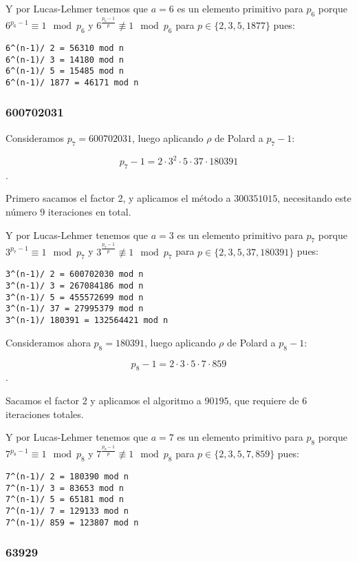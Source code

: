 \documentclass[a4paper]{article}
\begin{document}
Y por Lucas-Lehmer tenemos que $a=6$ es un elemento primitivo para $p_6$ porque $6^{p_6-1}\equiv 1\mod p_6$ y $6^{\frac{p_6-1}{p}}\not\equiv 1\mod p_6 $ para $p\in\{2, 3,5,1877\}$ pues:

\begin{verbatim}
6^(n-1)/ 2 = 56310 mod n
6^(n-1)/ 3 = 14180 mod n
6^(n-1)/ 5 = 15485 mod n
6^(n-1)/ 1877 = 46171 mod n
\end{verbatim}

\subsubsection{600702031}

Consideramos $p_7=600702031$, luego aplicando $\rho$ de Polard a $p_7-1$:

$$p_7-1=2 \cdot 3^2\cdot 5\cdot 37\cdot 180391$$.

Primero sacamos el factor 2, y aplicamos el método a $300351015$, necesitando este número 9 iteraciones en total.

Y por Lucas-Lehmer tenemos que $a=3$ es un elemento primitivo para $p_7$ porque $3^{p_7-1}\equiv 1\mod p_7$ y $3^{\frac{p_7-1}{p}}\not\equiv 1\mod p_7 $ para $p\in\{2, 3,5,37, 180391\}$ pues:

\begin{verbatim}
3^(n-1)/ 2 = 600702030 mod n
3^(n-1)/ 3 = 267084186 mod n
3^(n-1)/ 5 = 455572699 mod n
3^(n-1)/ 37 = 27995379 mod n
3^(n-1)/ 180391 = 132564421 mod n
\end{verbatim}

Consideramos ahora $p_8=180391$, luego aplicando $\rho$ de Polard a $p_8-1$:

$$p_8-1=2 \cdot 3\cdot 5\cdot 7\cdot 859$$.

Sacamos el factor 2 y aplicamos el algoritmo a $90195$, que requiere de 6 iteraciones totales.

Y por Lucas-Lehmer tenemos que $a=7$ es un elemento primitivo para $p_8$ porque $7^{p_8-1}\equiv 1\mod p_8$ y $7^{\frac{p_8-1}{p}}\not\equiv 1\mod p_8 $ para $p\in\{2, 3,5,7, 859\}$ pues:

\begin{verbatim}
7^(n-1)/ 2 = 180390 mod n
7^(n-1)/ 3 = 83653 mod n
7^(n-1)/ 5 = 65181 mod n
7^(n-1)/ 7 = 129133 mod n
7^(n-1)/ 859 = 123807 mod n
\end{verbatim}

\subsubsection{63929}
\end{document}
